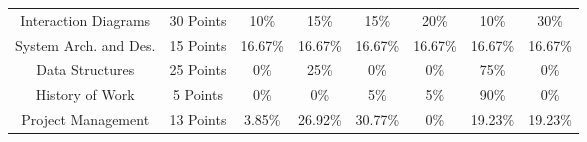 {\begin{figure}
\begin{centering}
\begin{tabular}{cc|c|c|c|c|c|c|}
\multicolumn{1}{|c|}{Interaction Diagrams} & \multicolumn{1}{c|}{30 Points} & 
10\% & 15\% & 15\% & 20\% & 10\% & 30\% \\ \cline{1-8}
\multicolumn{1}{|c|}{System Arch. and Des.} & \multicolumn{1}{c|}{15 Points} & 
16.67\% & 16.67\% & 16.67\% & 16.67\% & 16.67\% & 16.67\% \\ \cline{1-8}
\multicolumn{1}{|c|}{Data Structures} & \multicolumn{1}{c|}{25 Points} & 
0\% & 25\% & 0\% & 0\% & 75\% & 0\% \\ \cline{1-8}
\multicolumn{1}{|c|}{History of Work} & \multicolumn{1}{c|}{5 Points} & 
0\% & 0\% & 5\% & 5\% & 90\% & 0\% \\ \cline{1-8}
\multicolumn{1}{|c|}{Project Management} & \multicolumn{1}{c|}{13 Points} & 
3.85\% & 26.92\% & 30.77\% & 0\% & 19.23\% & 19.23\% \\ \cline{1-8}

\end{tabular}
\end{centering}
\end{figure}
}